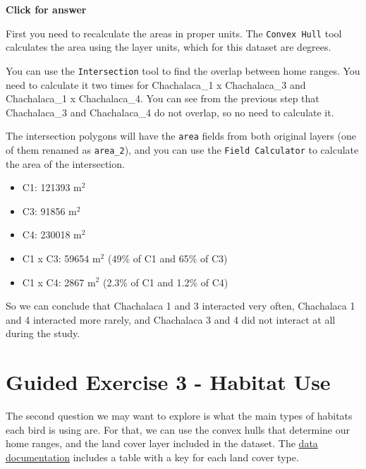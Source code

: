 \documentclass[
  letterpaper,
  DIV=11,
  numbers=noendperiod]{scrreprt}
\providecommand{\tightlist}{%
  \setlength{\itemsep}{0pt}\setlength{\parskip}{0pt}}\usepackage{longtable,booktabs,array}
\begin{document}
\begin{tcolorbox}[enhanced jigsaw, leftrule=.75mm, colframe=quarto-callout-important-color-frame, breakable, toprule=.15mm, bottomrule=.15mm, arc=.35mm, rightrule=.15mm, opacityback=0, colback=white, left=2mm]

\vspace{-3mm}\textbf{Click for answer}\vspace{3mm}

First you need to recalculate the areas in proper units. The
\texttt{Convex\ Hull} tool calculates the area using the layer units,
which for this dataset are degrees.

You can use the \texttt{Intersection} tool to find the overlap between
home ranges. You need to calculate it two times for Chachalaca\_1 x
Chachalaca\_3 and Chachalaca\_1 x Chachalaca\_4. You can see from the
previous step that Chachalaca\_3 and Chachalaca\_4 do not overlap, so no
need to calculate it.

The intersection polygons will have the \texttt{area} fields from both
original layers (one of them renamed as \texttt{area\_2}), and you can
use the \texttt{Field\ Calculator} to calculate the area of the
intersection.

\begin{itemize}
\tightlist
\item
  C1: 121393 m\(^2\)
\item
  C3: 91856 m\(^2\)
\item
  C4: 230018 m\(^2\)
\item
  C1 x C3: 59654 m\(^2\) (49\% of C1 and 65\% of C3)
\item
  C1 x C4: 2867 m\(^2\) (2.3\% of C1 and 1.2\% of C4)
\end{itemize}

So we can conclude that Chachalaca 1 and 3 interacted very often,
Chachalaca 1 and 4 interacted more rarely, and Chachalaca 3 and 4 did
not interact at all during the study.

\end{tcolorbox}

\section{Guided Exercise 3 - Habitat
Use}\label{guided-exercise-3---habitat-use}

The second question we may want to explore is what the main types of
habitats each bird is using are. For that, we can use the convex hulls
that determine our home ranges, and the land cover layer included in the
dataset. The
\href{https://www.arcgis.com/home/item.html?id=cfcb7609de5f478eb7666240902d4d3d}{data
documentation} includes a table with a key for each land cover type.
\end{document}
